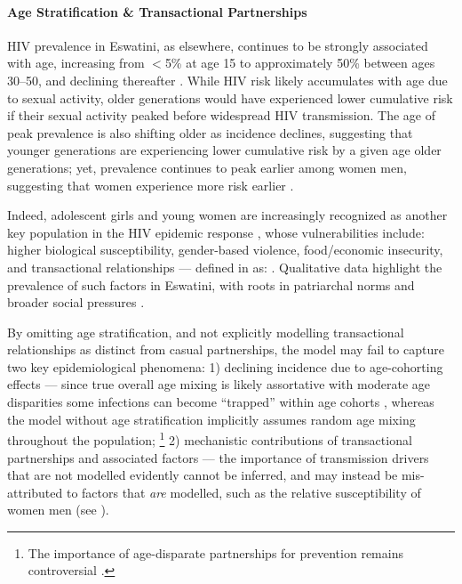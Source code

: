 \paragraph{Age Stratification \& Transactional Partnerships}
HIV prevalence in Eswatini, as elsewhere, continues to be strongly associated with age,
increasing from $<$5\% at age 15 to approximately 50\% between ages 30--50,
and declining thereafter \cite{SDHS2006,SHIMS1,SHIMS2}.
While HIV risk likely accumulates with age due to sexual activity,
older generations would have experienced lower cumulative risk
if their sexual activity peaked before widespread HIV transmission.
The age of peak prevalence is also shifting older as incidence declines, suggesting that
younger generations are experiencing lower cumulative risk by a given age \vs older generations;
yet, prevalence continues to peak earlier among women \vs men, suggesting that
women experience more risk earlier \cite{SDHS2006,SHIMS1,SHIMS2}.
\par
Indeed, adolescent girls and young women are increasingly recognized as another key population
in the HIV epidemic response \cite{Dellar2015}, whose vulnerabilities include:
higher biological susceptibility, gender-based violence, food/economic insecurity, and
transactional relationships --- defined in \cite{Stoebenau2016} as:
\cite{Yi2013,Dellar2015,Wamoyi2016}.
Qualitative data highlight the prevalence of such factors in Eswatini,
with roots in patriarchal norms and broader social pressures
\cite{Jones2006,Ruark2014,Fielding-Miller2016,Ruark2019,Pulerwitz2021}.
\par
By omitting age stratification,
and not explicitly modelling transactional relationships as distinct from casual partnerships,
the model may fail to capture two key epidemiological phenomena:
1) declining incidence due to age-cohorting effects ---
since true overall age mixing is likely assortative with moderate age disparities
\cite{Harling2014,Fielding-Miller2016,Pulerwitz2021}
some infections can become ``trapped'' within age cohorts \cite{Beauclair2018},
whereas the model without age stratification implicitly assumes
random age mixing throughout the population;%
\footnote{The importance of age-disparate partnerships for prevention remains controversial
  \cite{Leclerc-Madlala2008,Ott2011,Harling2014}.}
2) mechanistic contributions of transactional partnerships and associated factors ---
the importance of transmission drivers that are not modelled evidently cannot be inferred,
and may instead be mis-attributed to factors that \emph{are} modelled,
such as the relative susceptibility of women \vs men (see ).
